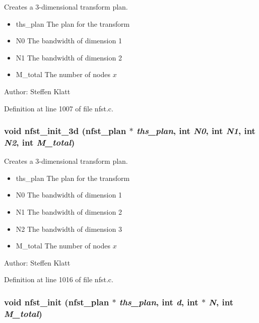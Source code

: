 Creates a 3-dimensional transform plan. 

\begin{itemize}
\item ths\_\-plan The plan for the transform \item N0 The bandwidth of dimension 1 \item N1 The bandwidth of dimension 2 \item M\_\-total The number of nodes $x$\end{itemize}
\begin{Desc}
\item[Author:]Steffen Klatt \end{Desc}


Definition at line 1007 of file nfst.c.\hypertarget{group__nfsct_gf1dd972b1831e75d3cfba0a0a2671711}{
\subsubsection{\setlength{\rightskip}{0pt plus 5cm}void nfst\_\-init\_\-3d ({\bf nfst\_\-plan} $\ast$ {\em ths\_\-plan}, int {\em N0}, int {\em N1}, int {\em N2}, int {\em M\_\-total})}}
\label{group__nfsct_gf1dd972b1831e75d3cfba0a0a2671711}


Creates a 3-dimensional transform plan. 

\begin{itemize}
\item ths\_\-plan The plan for the transform \item N0 The bandwidth of dimension 1 \item N1 The bandwidth of dimension 2 \item N2 The bandwidth of dimension 3 \item M\_\-total The number of nodes $x$\end{itemize}
\begin{Desc}
\item[Author:]Steffen Klatt \end{Desc}


Definition at line 1016 of file nfst.c.\hypertarget{group__nfsct_ge4043a9926de23326b21b8722648bafa}{
\subsubsection{\setlength{\rightskip}{0pt plus 5cm}void nfst\_\-init ({\bf nfst\_\-plan} $\ast$ {\em ths\_\-plan}, int {\em d}, int $\ast$ {\em N}, int {\em M\_\-total})}}
\label{group__nfsct_ge4043a9926de23326b21b8722648bafa}


